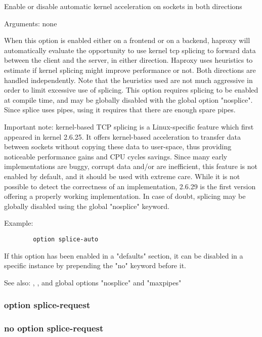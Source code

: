 
  Enable or disable automatic kernel acceleration on sockets in both directions
  

  Arguments: none

  When this option is enabled either on a frontend or on a backend, haproxy
  will automatically evaluate the opportunity to use kernel tcp splicing to
  forward data between the client and the server, in either direction. Haproxy
  uses heuristics to estimate if kernel splicing might improve performance or
  not. Both directions are handled independently. Note that the heuristics used
  are not much aggressive in order to limit excessive use of splicing. This
  option requires splicing to be enabled at compile time, and may be globally
  disabled with the global option "nosplice". Since splice uses pipes, using it
  requires that there are enough spare pipes.

  Important note: kernel-based TCP splicing is a Linux-specific feature which
  first appeared in kernel 2.6.25. It offers kernel-based acceleration to
  transfer data between sockets without copying these data to user-space, thus
  providing noticeable performance gains and CPU cycles savings. Since many
  early implementations are buggy, corrupt data and/or are inefficient, this
  feature is not enabled by default, and it should be used with extreme care.
  While it is not possible to detect the correctness of an implementation,
  2.6.29 is the first version offering a properly working implementation. In
  case of doubt, splicing may be globally disabled using the global "nosplice"
  keyword.

  Example:
  \begin{verbatim}
        option splice-auto
  \end{verbatim}

  If this option has been enabled in a "defaults" section, it can be disabled
  in a specific instance by prepending the "no" keyword before it.

  See also: , , and global
             options "nosplice" and "maxpipes"

\subsubsection{option splice-request}
\subsubsection{no option splice-request}

